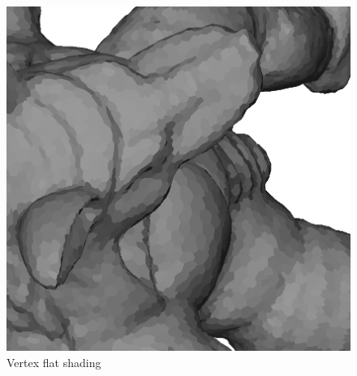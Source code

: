 \begin{figure}[!h]
    \endminipage\hfill
    \centering
    \includegraphics[scale=0.3]{images/armadillo-extendfs-2.png}
    \endminipage
    \caption{Vertex flat shading}
\end{figure}


